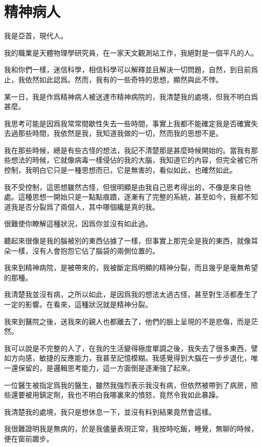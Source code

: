 \chapter{精神病人}
我是亞首，現代人。

我的職業是天體物理學研究員，在一家天文觀測站工作，我絕對是一個平凡的人。

我和你們一樣，迷信科學，相信科學可以解釋並且解決一切問題，自然，到目前爲止，我依然如此認爲。然而，我有的一些奇特的思想，顯然與此不悖。



某一日，我是作爲精神病人被送達市精神病院的，我清楚我的處境，但我不明白爲甚麼。

我思考可能是因爲我常常間歇性失去一些時間，事實上我都不能確定我是否確實失去過那些時間，我依然是我，我知道我做的一切，然而我的思想不是。

我在那些時候，總是有些古怪的想法，我記不清楚那是甚麼時候開始的。當我有那些想法的時候，它就像病毒一樣侵佔的我的大腦，我知道它的內容，但完全被它所控制，我明白它只是一種思想而已，它是無害的，看似如此，也確然如此。

我不受控制，這思想雖然古怪，但很明顯是由我自己思考得出的，不像是來自他處。這種思想一開始只是一點點痕蹟，逐漸有了完整的系統，甚至如今，我都不知道我是否分裂爲了兩個人，其中哪個纔是真的我。

很難使你瞭解這種狀況，因爲你並沒有如此過。

聽起來很像是我的腦被別的東西佔據了一樣，但事實上那完全是我的東西，就像耳朵一樣，沒有人會抱怨它佔了腦袋的兩側位置的。



我來到精神病院，是被帶來的，我被斷定爲明顯的精神分裂，而且幾乎是毫無希望的那種。

我清楚我並沒有病，之所以如此，是因爲我的想法太過古怪，甚至對生活都產生了一定的影響。在看來，這種狀況就是精神分裂。

我來到醫院之後，送我來的親人也都離去了，他們的臉上呈現的不是悲傷，而是茫然。

我可以說是不完整的人了，在我的生活變得極度單調之後，我失去了很多東西，譬如方向感，敏捷的反應能力，我甚至記憶模糊。我感覺得到大腦在一步步退化，唯一還保留的，是邏輯思考能力，這一方面倒是逐漸強了起來。



一位醫生被指定爲我的醫生，雖然我強烈表示我沒有病，但依然被帶到了病房，險些還要被用鎮定劑，我也不明白我哪裏來的憤怒，竟然令我如此暴躁。

我清楚我的處境，我只是想休息一下，並沒有料到結果竟然會這樣。

我很難證明我是無病的，於是我儘量表現正常，我按時吃飯，睡覺，無聊的時候，便在窗前踱步。

